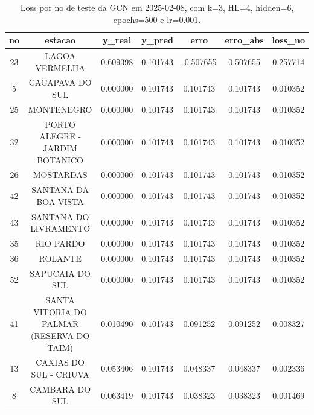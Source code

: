 \begin{table}[h]
\centering
\caption{Loss por no de teste da GCN em 2025-02-08, com k=3, HL=4, hidden=6, epochs=500 e lr=0.001.}
\label{tab:gcn_loss_k3_hl4_h6_e500_d20250208}
\begin{tabular}{ccccccc}
\toprule
no & estacao & y\_real & y\_pred & erro & erro\_abs & loss\_no \\
\midrule
23 & LAGOA VERMELHA & 0.609398 & 0.101743 & -0.507655 & 0.507655 & 0.257714 \\
5 & CACAPAVA DO SUL & 0.000000 & 0.101743 & 0.101743 & 0.101743 & 0.010352 \\
25 & MONTENEGRO & 0.000000 & 0.101743 & 0.101743 & 0.101743 & 0.010352 \\
32 & PORTO ALEGRE - JARDIM BOTANICO & 0.000000 & 0.101743 & 0.101743 & 0.101743 & 0.010352 \\
26 & MOSTARDAS & 0.000000 & 0.101743 & 0.101743 & 0.101743 & 0.010352 \\
42 & SANTANA DA BOA VISTA & 0.000000 & 0.101743 & 0.101743 & 0.101743 & 0.010352 \\
43 & SANTANA DO LIVRAMENTO & 0.000000 & 0.101743 & 0.101743 & 0.101743 & 0.010352 \\
35 & RIO PARDO & 0.000000 & 0.101743 & 0.101743 & 0.101743 & 0.010352 \\
36 & ROLANTE & 0.000000 & 0.101743 & 0.101743 & 0.101743 & 0.010352 \\
52 & SAPUCAIA DO SUL & 0.000000 & 0.101743 & 0.101743 & 0.101743 & 0.010352 \\
41 & SANTA VITORIA DO PALMAR (RESERVA DO TAIM) & 0.010490 & 0.101743 & 0.091252 & 0.091252 & 0.008327 \\
13 & CAXIAS DO SUL - CRIUVA & 0.053406 & 0.101743 & 0.048337 & 0.048337 & 0.002336 \\
8 & CAMBARA DO SUL & 0.063419 & 0.101743 & 0.038323 & 0.038323 & 0.001469 \\
\bottomrule
\end{tabular}
\end{table}
